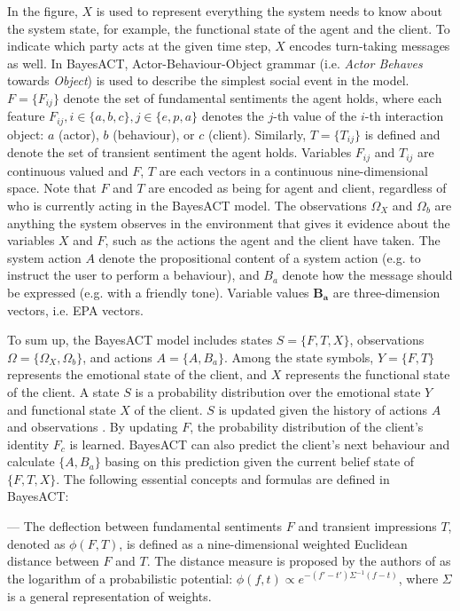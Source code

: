 In the figure, $X$ is used to represent everything the system needs to know about the system state, for example, the functional state of the agent and the client. To indicate which party acts at the given time step, $X$ encodes turn-taking messages as well. In BayesACT, Actor-Behaviour-Object grammar (i.e. \textit{Actor Behaves} towards \textit{Object}) is used to describe the simplest social event in the model. $F = \{F_{ij}\}$ denote the set of fundamental sentiments the agent holds, where each feature $F_{ij}, i \in \{a, b, c\}, j \in \{e, p, a\}$ denotes the $j$-th value of the $i$-th interaction object: $a$ (actor), $b$ (behaviour), or $c$ (client). Similarly, $T = \{T_{ij}\}$ is defined and denote the set of transient sentiment the agent holds. Variables $F_{ij}$ and $T_{ij}$ are continuous valued and $F$, $T$ are each vectors in a continuous nine-dimensional space. Note that $F$ and $T$ are encoded as being for agent and client, regardless of who is currently acting in the BayesACT model. The observations $\Omega_{X}$ and $\Omega_{b}$ are anything the system observes in the environment that gives it evidence about the variables $X$ and $F$, such as the actions the agent and the client have taken. The system action $A$ denote the propositional content of a system action (e.g. to instruct the user to perform a behaviour), and $B_{a}$ denote how the message should be expressed (e.g. with a friendly tone). Variable values $\mathbf{B_{a}}$ are three-dimension vectors, i.e. EPA vectors.

To sum up, the BayesACT model includes states $S = \{F, T, X\}$, observations $\Omega = \{\Omega_{X}, \Omega_{b}\}$, and actions $A = \{A, B_{a}\}$. Among the state symbols, $Y = \{F, T\}$ represents the emotional state of the client, and $X$ represents the functional state of the client. A state $S$ is a probability distribution over the emotional state $Y$ and functional state $X$ of the client. $S$ is updated given the history of actions $A$ and observations . By updating $F$, the probability distribution of the client's identity $F_{c}$ is learned. BayesACT can also predict the client's next behaviour and calculate $\{A, B_{a}\}$ basing on this prediction given the current belief state of $\{F, T, X\}$. The following essential concepts and formulas are defined in BayesACT:

--- The deflection between fundamental sentiments $F$ and transient impressions $T$, denoted as  $\phi(F, T)$, is defined as a nine-dimensional weighted Euclidean distance between $F$ and $T$. The distance measure is proposed by the authors of \cite{hoey2013bayesian} as the logarithm of a probabilistic potential: $\phi(f,t) \propto e^{-(f'-t')\Sigma^{-1}(f-t)}$, where $\Sigma$ is a general representation of weights. 

